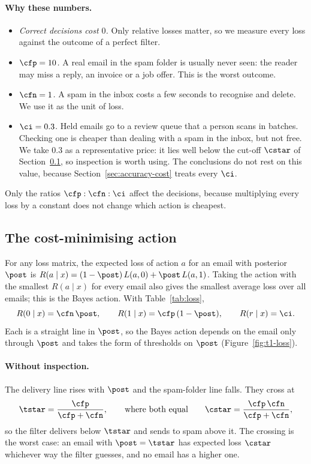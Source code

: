 \paragraph{Why these numbers.}
\begin{itemize}[itemsep=1pt,topsep=2pt]
  \item \emph{Correct decisions cost $0$.} Only relative losses matter, so we measure every loss against
        the outcome of a perfect filter.
  \item \emph{$\cfp=10$.} A real email in the spam folder is usually never seen: the reader may miss a
        reply, an invoice or a job offer. This is the worst outcome.
  \item \emph{$\cfn=1$.} A spam in the inbox costs a few seconds to recognise and delete. We use it as
        the unit of loss.
  \item \emph{$\ci=0.3$.} Held emails go to a review queue that a person scans in batches. Checking one
        is cheaper than dealing with a spam in the inbox, but not free. We take $0.3$ as a
        representative price: it lies well below the cut-off $\cstar$ of Section~\ref{sec:bayes-action},
        so inspection is worth using. The conclusions do not rest on this value, because
        Section~\ref{sec:accuracy-cost} treats every $\ci$.
\end{itemize}
Only the ratios $\cfp:\cfn:\ci$ affect the decisions, because multiplying every loss by a constant
does not change which action is cheapest.

\subsection{The cost-minimising action}
\label{sec:bayes-action}

For any loss matrix, the expected loss of action $a$ for an email with posterior $\post$ is
$R(a\mid x) = (1-\post)\,L(a,0) + \post\,L(a,1)$. Taking the action with the smallest $R(a\mid x)$
for every email also gives the smallest average loss over all emails; this is the Bayes action.
With Table~\ref{tab:loss},
\begin{equation}
  R(0\mid x) = \cfn\,\post, \qquad R(1\mid x) = \cfp\,(1-\post), \qquad R(r\mid x) = \ci .
  \label{eq:three-risks}
\end{equation}
Each is a straight line in $\post$, so the Bayes action depends on the email only through $\post$
and takes the form of thresholds on $\post$ (Figure~\ref{fig:t1-loss}).

\paragraph{Without inspection.}
The delivery line rises with $\post$ and the spam-folder line falls. They cross at
\[
  \tstar = \frac{\cfp}{\cfp+\cfn}, \qquad\text{where both equal}\qquad \cstar = \frac{\cfp\,\cfn}{\cfp+\cfn},
\]
so the filter delivers below $\tstar$ and sends to spam above it. The crossing is the worst case: an
email with $\post=\tstar$ has expected loss $\cstar$ whichever way the filter guesses, and no email
has a higher one.

